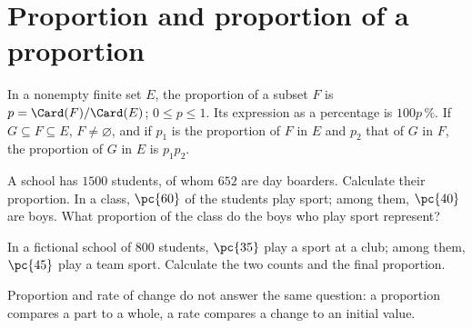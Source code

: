 \section{Proportion and proportion of a proportion}
\begin{keypoint}[Definitions]
In a nonempty finite set $E$, the proportion of a subset $F$ is $p=\Card(F)/\Card(E)$; $0\leq p\leq1$. Its expression as a percentage is $100p\,\%$.
If $G\subseteq F\subseteq E$, $F\ne\varnothing$, and if $p_1$ is the proportion of $F$ in $E$ and $p_2$ that of $G$ in $F$, the proportion of $G$ in $E$ is $p_1p_2$.
\end{keypoint}
\begin{example}A school has $1500$ students, of whom $652$ are day boarders. Calculate their proportion. In a class, $\pc{60}$ of the students play sport; among them, $\pc{40}$ are boys. What proportion of the class do the boys who play sport represent?\end{example}
\begin{example}In a fictional school of $800$ students, $\pc{35}$ play a sport at a club; among them, $\pc{45}$ play a team sport. Calculate the two counts and the final proportion.\end{example}
\begin{pitfall}Proportion and rate of change do not answer the same question: a proportion compares a part to a whole, a rate compares a change to an initial value.\end{pitfall}

